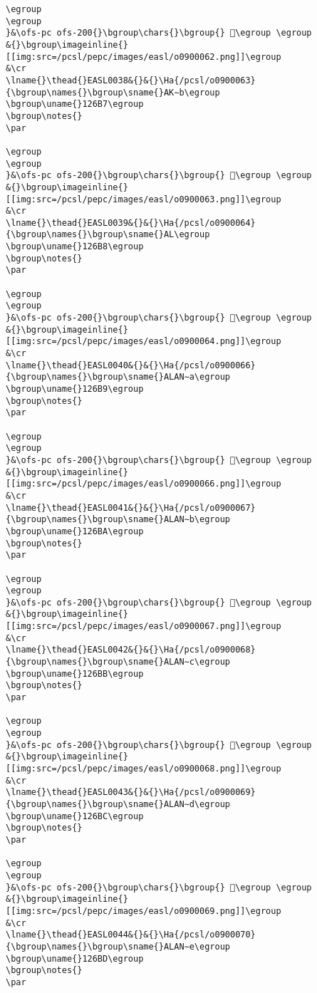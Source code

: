 \begin{verbatim}
\egroup
\egroup
}&\ofs-pc ofs-200{}\bgroup\chars{}\bgroup{} 𒚶\egroup \egroup
&{}\bgroup\imageinline{}[[img:src=/pcsl/pepc/images/easl/o0900062.png]]\egroup
&\cr
\lname{}\thead{}EASL0038&{}&{}\Ha{/pcsl/o0900063}{\bgroup\names{}\bgroup\sname{}AK∼b\egroup
\bgroup\uname{}126B7\egroup
\bgroup\notes{}
\par 

\egroup
\egroup
}&\ofs-pc ofs-200{}\bgroup\chars{}\bgroup{} 𒚷\egroup \egroup
&{}\bgroup\imageinline{}[[img:src=/pcsl/pepc/images/easl/o0900063.png]]\egroup
&\cr
\lname{}\thead{}EASL0039&{}&{}\Ha{/pcsl/o0900064}{\bgroup\names{}\bgroup\sname{}AL\egroup
\bgroup\uname{}126B8\egroup
\bgroup\notes{}
\par 

\egroup
\egroup
}&\ofs-pc ofs-200{}\bgroup\chars{}\bgroup{} 𒚸\egroup \egroup
&{}\bgroup\imageinline{}[[img:src=/pcsl/pepc/images/easl/o0900064.png]]\egroup
&\cr
\lname{}\thead{}EASL0040&{}&{}\Ha{/pcsl/o0900066}{\bgroup\names{}\bgroup\sname{}ALAN∼a\egroup
\bgroup\uname{}126B9\egroup
\bgroup\notes{}
\par 

\egroup
\egroup
}&\ofs-pc ofs-200{}\bgroup\chars{}\bgroup{} 𒚹\egroup \egroup
&{}\bgroup\imageinline{}[[img:src=/pcsl/pepc/images/easl/o0900066.png]]\egroup
&\cr
\lname{}\thead{}EASL0041&{}&{}\Ha{/pcsl/o0900067}{\bgroup\names{}\bgroup\sname{}ALAN∼b\egroup
\bgroup\uname{}126BA\egroup
\bgroup\notes{}
\par 

\egroup
\egroup
}&\ofs-pc ofs-200{}\bgroup\chars{}\bgroup{} 𒚺\egroup \egroup
&{}\bgroup\imageinline{}[[img:src=/pcsl/pepc/images/easl/o0900067.png]]\egroup
&\cr
\lname{}\thead{}EASL0042&{}&{}\Ha{/pcsl/o0900068}{\bgroup\names{}\bgroup\sname{}ALAN∼c\egroup
\bgroup\uname{}126BB\egroup
\bgroup\notes{}
\par 

\egroup
\egroup
}&\ofs-pc ofs-200{}\bgroup\chars{}\bgroup{} 𒚻\egroup \egroup
&{}\bgroup\imageinline{}[[img:src=/pcsl/pepc/images/easl/o0900068.png]]\egroup
&\cr
\lname{}\thead{}EASL0043&{}&{}\Ha{/pcsl/o0900069}{\bgroup\names{}\bgroup\sname{}ALAN∼d\egroup
\bgroup\uname{}126BC\egroup
\bgroup\notes{}
\par 

\egroup
\egroup
}&\ofs-pc ofs-200{}\bgroup\chars{}\bgroup{} 𒚼\egroup \egroup
&{}\bgroup\imageinline{}[[img:src=/pcsl/pepc/images/easl/o0900069.png]]\egroup
&\cr
\lname{}\thead{}EASL0044&{}&{}\Ha{/pcsl/o0900070}{\bgroup\names{}\bgroup\sname{}ALAN∼e\egroup
\bgroup\uname{}126BD\egroup
\bgroup\notes{}
\par 


\end{verbatim}
